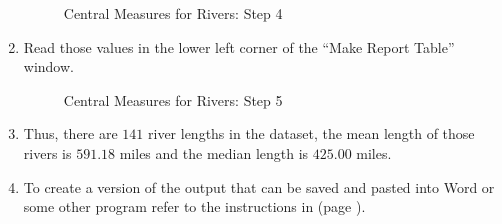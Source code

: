 \begin{enumerate}
  \begin{figure}[H]
    \begin{center}
      \caption{Central Measures for Rivers: Step 4}
    \end{center}
  \end{figure}
  
  \item Read those values in the lower left corner of the ``Make Report Table'' window.

  \begin{figure}[H]
    \begin{center}
      \caption{Central Measures for Rivers: Step 5}
    \end{center}
  \end{figure}

  \item Thus, there are $ 141 $ river lengths in the dataset, the mean length of those rivers is $ 591.18 $ miles and the median length is $ 425.00 $ miles. 
  
  \item To create a version of the output that can be saved and pasted into Word or some other program refer to the instructions in  (page \pageref{app:b}).

\end{enumerate}

